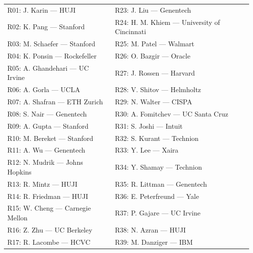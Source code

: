 \documentclass[10pt]{article}
\begin{document}
\setlength{\tabcolsep}{2pt}
\renewcommand{\arraystretch}{1.05}
\begin{tabular}{@{}p{}p{}@{}}
R01: J. Karin --- HUJI & R23: J. Liu --- Genentech \\

R02: K. Pang --- Stanford & R24: H. M. Khiem --- University of Cincinnati \\

R03: M. Schaefer --- Stanford & R25: M. Patel --- Walmart \\

R04: K. Ponsin --- Rockefeller & R26: O. Bazgir --- Oracle \\

R05: A. Ghandehari --- UC Irvine & R27: J. Rossen --- Harvard \\

R06: A. Gorla --- UCLA & R28: V. Shitov --- Helmholtz \\

R07: A. Shafran --- ETH Zurich & R29: N. Walter --- CISPA \\

R08: S. Nair --- Genentech & R30: A. Fomitchev --- UC Santa Cruz \\

R09: A. Gupta --- Stanford & R31: S. Joshi --- Intuit \\

R10: M. Bereket --- Stanford & R32: S. Kurant --- Technion \\

R11: A. Wu --- Genentech & R33: Y. Lee --- Xaira \\

R12: N. Mudrik --- Johns Hopkins & R34: Y. Shamay --- Technion \\

R13: R. Mintz --- HUJI & R35: R. Littman --- Genentech \\

R14: R. Friedman --- HUJI & R36: E. Peterfreund --- Yale \\

R15: W. Cheng --- Carnegie Mellon & R37: P. Gajare --- UC Irvine \\

R16: Z. Zhu --- UC Berkeley & R38: N. Azran --- HUJI \\

R17: R. Lacombe --- HCVC & R39: M. Danziger --- IBM \\


\end{tabular}
\end{document}
